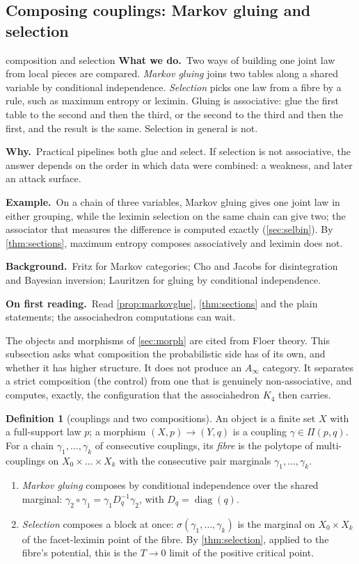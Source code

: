 \documentclass[11pt]{article}
\theoremstyle{definition}\newtheorem{definition}[theorem]{Definition}\newtheorem{remark}[theorem]{Remark}\newtheorem{example}[theorem]{Example}\newtheorem{problem}[theorem]{Open problem}\crefname{problem}{Problem}{Problems}
\newcommand{\rbwhat}{\textcolor{rbWhat}{\textbf{What we do.}}~}\newcommand{\rbwhy}{\par\smallskip\textcolor{rbWhy}{\textbf{Why.}}~}
\newcommand{\rbex}{\par\smallskip\textcolor{rbEx}{\textbf{Example.}}~}\newcommand{\rbbg}{\par\smallskip\textcolor{rbBg}{\textbf{Background.}}~}
\newcommand{\rbfirst}{\par\smallskip\textcolor{rbFirst}{\textbf{On first reading.}}~}
\begin{document}
\subsection{Composing couplings: Markov gluing and selection}\label{sec:selcomp}
\begin{readerbox}{composition and selection}
\rbwhat Two ways of building one joint law from local pieces are compared. \emph{Markov gluing} joins two tables along a shared variable by conditional independence. \emph{Selection} picks one law from a fibre by a rule, such as maximum entropy or leximin. Gluing is associative: glue the first table to the second and then the third, or the second to the third and then the first, and the result is the same. Selection in general is not.
\rbwhy Practical pipelines both glue and select. If selection is not associative, the answer depends on the order in which data were combined: a weakness, and later an attack surface.
\rbex On a chain of three variables, Markov gluing gives one joint law in either grouping, while the leximin selection on the same chain can give two; the associator that measures the difference is computed exactly (\cref{sec:selbin}). By \cref{thm:sections}, maximum entropy composes associatively and leximin does not.
\rbbg Fritz \cite{Fritz2020} for Markov categories; Cho and Jacobs \cite{ChoJacobs2019} for disintegration and Bayesian inversion; Lauritzen \cite{Lauritzen1996} for gluing by conditional independence.
\rbfirst Read \cref{prop:markovglue}, \cref{thm:sections} and the plain statements; the associahedron computations can wait.
\end{readerbox}
The objects and morphisms of \cref{sec:morph} are cited from Floer theory. This subsection asks what composition the probabilistic side has of its own, and whether it has higher structure. It does not
produce an $A_\infty$ category. It separates a strict composition (the control) from one that is genuinely non-associative, and computes, exactly, the configuration that the associahedron $K_4$ then
carries.

\begin{definition}[couplings and two compositions]\label{def:selcomp}
An object is a finite set $X$ with a full-support law $p$; a morphism $(X,p)\to(Y,q)$ is a coupling $\gamma\in\Pi(p,q)$. For a chain $\gamma_1,\dots,\gamma_k$ of consecutive couplings, its \emph{fibre} is the
polytope of multi-couplings on $X_0\times\dots\times X_k$ with the consecutive pair marginals $\gamma_1,\dots,\gamma_k$.
\begin{enumerate}
\item[(1)] \emph{Markov gluing} composes by conditional independence over the shared marginal: $\gamma_2\circ\gamma_1=\gamma_1D_q^{-1}\gamma_2$, with $D_q=\operatorname{diag}(q)$.
\item[(2)] \emph{Selection} composes a block at once: $\sigma(\gamma_1,\dots,\gamma_k)$ is the marginal on $X_0\times X_k$ of the facet-leximin point of the fibre. By \cref{thm:selection}, applied to the fibre's
potential, this is the $T\to0$ limit of the positive critical point.
\end{enumerate}
\end{definition}
\end{document}
